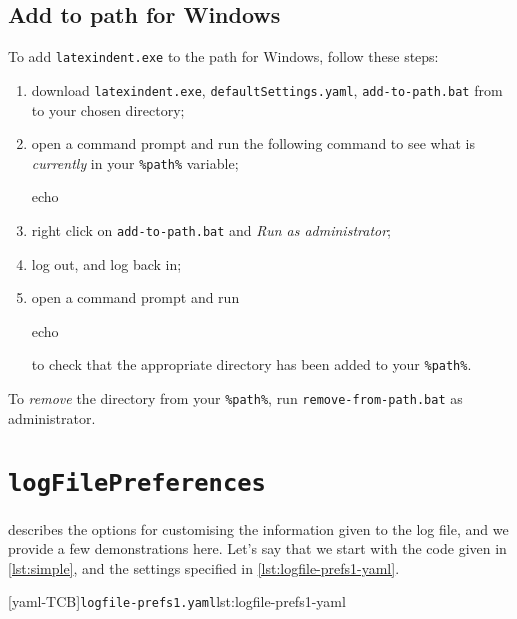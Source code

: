 	\subsection{Add to path for Windows}
		To add \texttt{latexindent.exe} to the path for Windows, follow these steps:
		\begin{enumerate}
			\item download  \texttt{latexindent.exe}, \texttt{defaultSettings.yaml},  \texttt{add-to-path.bat} from \cite{latexindent-home} to your chosen directory;
			\item open a command prompt and run the following command to see what is \emph{currently} in your \lstinline!%path%! variable; \begin{dosprompt}
echo %
          \end{dosprompt}
			\item right click on \texttt{add-to-path.bat} and \emph{Run as administrator};
			\item log out, and log back in;
			\item open a command prompt and run \begin{dosprompt}
echo %
          \end{dosprompt} to check that the appropriate directory has been added to your \lstinline!%path%!.
		\end{enumerate}
		To \emph{remove} the directory from your \lstinline!%path%!, run \texttt{remove-from-path.bat} as administrator.

	\section{\texttt{logFilePreferences}}
	 \label{app:logfile-demo}
	  describes the options for customising the information given
	 to the log file, and we provide a few demonstrations here.
	 Let's say that we start with the code given in \cref{lst:simple}, and the settings specified in \cref{lst:logfile-prefs1-yaml}.

	 \begin{minipage}{.35\linewidth}
	 \end{minipage}
	 \hfill
	 \begin{minipage}{.6\linewidth}
		 [yaml-TCB]{\texttt{logfile-prefs1.yaml}}{lst:logfile-prefs1-yaml}
	 \end{minipage}

